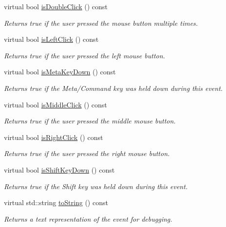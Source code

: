 \begin{DoxyCompactItemize}
virtual bool \mbox{\hyperlink{classGEvent_a40b4e808443ad49df2a79a6b1011be7a}{is\+Double\+Click}} () const
\begin{DoxyCompactList}\small\item\em Returns true if the user pressed the mouse button multiple times. \end{DoxyCompactList}\item 
virtual bool \mbox{\hyperlink{classGEvent_ae6b870593fd0c645b97f2382ac40253a}{is\+Left\+Click}} () const
\begin{DoxyCompactList}\small\item\em Returns true if the user pressed the left mouse button. \end{DoxyCompactList}\item 
virtual bool \mbox{\hyperlink{classGEvent_a37aa61a279efea6cb36cb5e6d8ada04c}{is\+Meta\+Key\+Down}} () const
\begin{DoxyCompactList}\small\item\em Returns {\ttfamily true} if the Meta/\+Command key was held down during this event. \end{DoxyCompactList}\item 
virtual bool \mbox{\hyperlink{classGEvent_a92daecef1639c08c9565df591d261026}{is\+Middle\+Click}} () const
\begin{DoxyCompactList}\small\item\em Returns true if the user pressed the middle mouse button. \end{DoxyCompactList}\item 
virtual bool \mbox{\hyperlink{classGEvent_abf4c07eef83e15984a352af91c927d3d}{is\+Right\+Click}} () const
\begin{DoxyCompactList}\small\item\em Returns true if the user pressed the right mouse button. \end{DoxyCompactList}\item 
virtual bool \mbox{\hyperlink{classGEvent_a814434d4ee5d0792e2c9ffdf8433766c}{is\+Shift\+Key\+Down}} () const
\begin{DoxyCompactList}\small\item\em Returns {\ttfamily true} if the Shift key was held down during this event. \end{DoxyCompactList}\item 
virtual std\+::string \mbox{\hyperlink{classGEvent_a1fe5121d6528fdea3f243321b3fa3a49}{to\+String}} () const
\begin{DoxyCompactList}\small\item\em Returns a text representation of the event for debugging. \end{DoxyCompactList}\end{DoxyCompactItemize}
